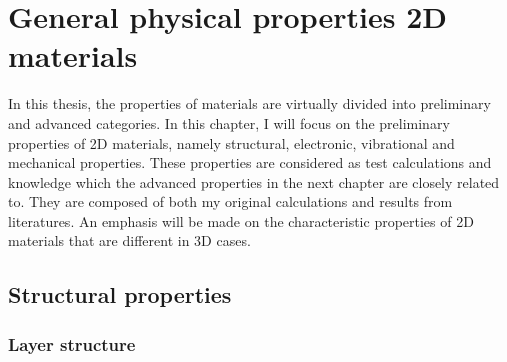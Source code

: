 
\chapter{General physical properties 2D materials \label{chap:3}}

\ifpdf
    \graphicspath{{Chapter3/Figs/Raster/}{Chapter3/Figs/PDF/}{Chapter3/Figs/}{Chapter3/Figs/Vector/}}
\else
    \graphicspath{{Chapter3/Figs/Vector/}{Chapter3/Figs/}}
\fi

In this thesis, the properties of materials are virtually divided into preliminary and advanced categories. In this chapter, I will focus on the preliminary properties of 2D materials, namely structural, electronic, vibrational and mechanical properties. These properties are considered as test calculations and knowledge which the advanced properties in the next chapter are closely related to. They are composed of both my original calculations and results from literatures. An emphasis will be made on the characteristic properties of 2D materials that are different in 3D cases.

\section{Structural properties}
\subsection{Layer structure}

